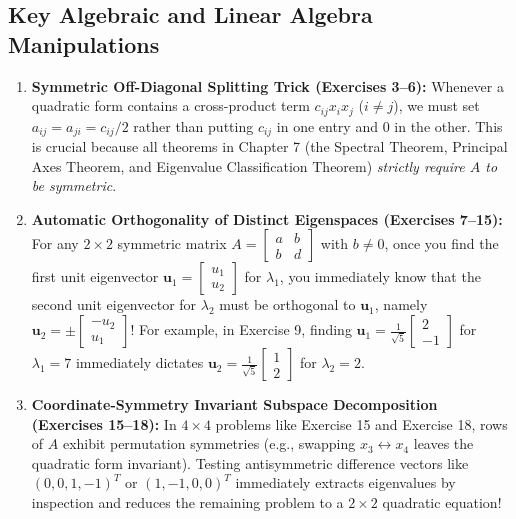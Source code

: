 \documentclass[11pt, letterpaper]{article}
\theoremstyle{definition}
\theoremstyle{remark}
\begin{document}
\subsection{Key Algebraic and Linear Algebra Manipulations}
\begin{enumerate}
    \item \textbf{Symmetric Off-Diagonal Splitting Trick (Exercises 3--6):}
    Whenever a quadratic form contains a cross-product term $c_{ij} x_i x_j$ ($i \neq j$), we must set $a_{ij} = a_{ji} = c_{ij}/2$ rather than putting $c_{ij}$ in one entry and $0$ in the other. This is crucial because all theorems in Chapter 7 (the Spectral Theorem, Principal Axes Theorem, and Eigenvalue Classification Theorem) \textit{strictly require $A$ to be symmetric}.
    
    \item \textbf{Automatic Orthogonality of Distinct Eigenspaces (Exercises 7--15):}
    For any $2 \times 2$ symmetric matrix $A = \begin{bmatrix} a & b \\ b & d \end{bmatrix}$ with $b \neq 0$, once you find the first unit eigenvector $\mathbf{u}_1 = \begin{bmatrix} u_1 \\ u_2 \end{bmatrix}$ for $\lambda_1$, you immediately know that the second unit eigenvector for $\lambda_2$ must be orthogonal to $\mathbf{u}_1$, namely $\mathbf{u}_2 = \pm \begin{bmatrix} -u_2 \\ u_1 \end{bmatrix}$! For example, in Exercise 9, finding $\mathbf{u}_1 = \frac{1}{\sqrt{5}}\begin{bmatrix} 2 \\ -1 \end{bmatrix}$ for $\lambda_1 = 7$ immediately dictates $\mathbf{u}_2 = \frac{1}{\sqrt{5}}\begin{bmatrix} 1 \\ 2 \end{bmatrix}$ for $\lambda_2 = 2$.
    
    \item \textbf{Coordinate-Symmetry Invariant Subspace Decomposition (Exercises 15--18):}
    In $4 \times 4$ problems like Exercise 15 and Exercise 18, rows of $A$ exhibit permutation symmetries (e.g., swapping $x_3 \leftrightarrow x_4$ leaves the quadratic form invariant). Testing antisymmetric difference vectors like $(0, 0, 1, -1)^T$ or $(1, -1, 0, 0)^T$ immediately extracts eigenvalues by inspection and reduces the remaining problem to a $2 \times 2$ quadratic equation!
    

\end{enumerate}
\end{document}
